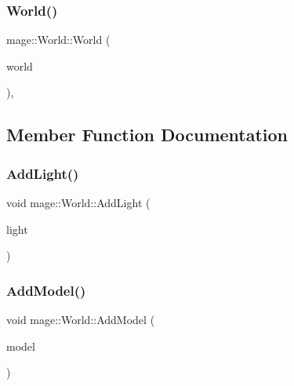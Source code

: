 \hypertarget{classmage_1_1_world_a28e20e33499cd57282cefa5ab0fda041}{}\label{classmage_1_1_world_a28e20e33499cd57282cefa5ab0fda041} 
\subsubsection{\texorpdfstring{World()}{World()}\hspace{0.1cm}{\footnotesize\ttfamily [2/2]}}
{\footnotesize\ttfamily mage\+::\+World\+::\+World (\begin{DoxyParamCaption}\item[{const \hyperlink{classmage_1_1_world}{World} \&}]{world }\end{DoxyParamCaption})\hspace{0.3cm}{\ttfamily [private]}, {\ttfamily [delete]}}



\subsection{Member Function Documentation}
\hypertarget{classmage_1_1_world_ab0c31d3113ea264fed8b8ef034047c91}{}\label{classmage_1_1_world_ab0c31d3113ea264fed8b8ef034047c91} 
\subsubsection{\texorpdfstring{Add\+Light()}{AddLight()}}
{\footnotesize\ttfamily void mage\+::\+World\+::\+Add\+Light (\begin{DoxyParamCaption}\item[{\hyperlink{namespacemage_a1e01ae66713838a7a67d30e44c67703e}{Shared\+Ptr}$<$ \hyperlink{structmage_1_1_point_light}{Point\+Light} $>$}]{light }\end{DoxyParamCaption})}

\hypertarget{classmage_1_1_world_a4b7287a11ff316b029ec7727ed0d076d}{}\label{classmage_1_1_world_a4b7287a11ff316b029ec7727ed0d076d} 
\subsubsection{\texorpdfstring{Add\+Model()}{AddModel()}}
{\footnotesize\ttfamily void mage\+::\+World\+::\+Add\+Model (\begin{DoxyParamCaption}\item[{\hyperlink{namespacemage_a1e01ae66713838a7a67d30e44c67703e}{Shared\+Ptr}$<$ \hyperlink{classmage_1_1_model}{Model} $>$}]{model }\end{DoxyParamCaption})}

